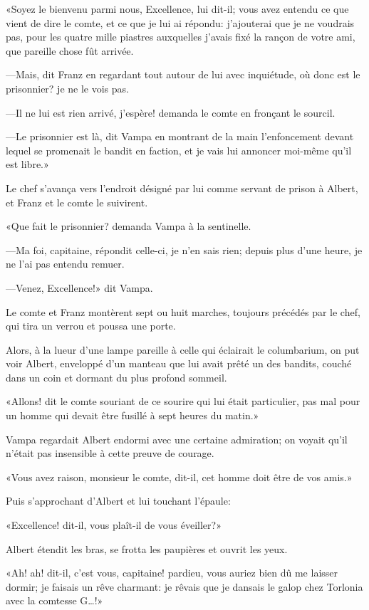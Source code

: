 «Soyez le bienvenu parmi nous, Excellence, lui dit-il; vous avez entendu ce que vient de dire le comte, et ce que je lui ai répondu: j'ajouterai que je ne voudrais pas, pour les quatre mille piastres auxquelles j'avais fixé la rançon de votre ami, que pareille chose fût arrivée. 

—Mais, dit Franz en regardant tout autour de lui avec inquiétude, où donc est le prisonnier? je ne le vois pas. 

—Il ne lui est rien arrivé, j'espère! demanda le comte en fronçant le sourcil. 

—Le prisonnier est là, dit Vampa en montrant de la main l'enfoncement devant lequel se promenait le bandit en faction, et je vais lui annoncer moi-même qu'il est libre.»  

Le chef s'avança vers l'endroit désigné par lui comme servant de prison à Albert, et Franz et le comte le suivirent. 

«Que fait le prisonnier? demanda Vampa à la sentinelle. 

—Ma foi, capitaine, répondit celle-ci, je n'en sais rien; depuis plus d'une heure, je ne l'ai pas entendu remuer. 

—Venez, Excellence!» dit Vampa. 

Le comte et Franz montèrent sept ou huit marches, toujours précédés par le chef, qui tira un verrou et poussa une porte. 

Alors, à la lueur d'une lampe pareille à celle qui éclairait le columbarium, on put voir Albert, enveloppé d'un manteau que lui avait prêté un des bandits, couché dans un coin et dormant du plus profond sommeil. 

«Allons! dit le comte souriant de ce sourire qui lui était particulier, pas mal pour un homme qui devait être fusillé à sept heures du matin.» 

Vampa regardait Albert endormi avec une certaine admiration; on voyait qu'il n'était pas insensible à cette preuve de courage. 

«Vous avez raison, monsieur le comte, dit-il, cet homme doit être de vos amis.» 

Puis s'approchant d'Albert et lui touchant l'épaule: 

«Excellence! dit-il, vous plaît-il de vous éveiller?» 

Albert étendit les bras, se frotta les paupières et ouvrit les yeux. 

«Ah! ah! dit-il, c'est vous, capitaine! pardieu, vous auriez bien dû me laisser dormir; je faisais un rêve charmant: je rêvais que je dansais le galop chez Torlonia avec la comtesse G\dots!» 


